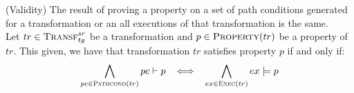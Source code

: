 \begin{proposition}{(Validity) The result of proving a property on a set of path conditions generated for a transformation or an all executions of that transformation is the same.\\}
\label{prop:proof_validity_appendix}
Let $tr\in \textsc{Transf}^{sr}_{tg}$ be a transformation and $p \in \textsc{Property}(tr)$ be a
property of $tr$. This given, we have that transformation $tr$ satisfies property $p$ if and only if:
\begin{equation}
\label{eq:prop_proof_transf_appendix}
\bigwedge_{pc\in \textsc{Pathcond}(tr)} pc\vdash p \hspace{.3cm} \Longleftrightarrow \hspace{.3cm} \bigwedge_{ex\in \textsc{Exec}(tr)}ex\models p
\end{equation}
\end{proposition}
